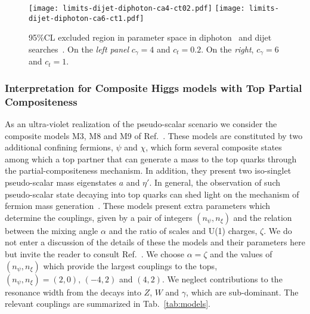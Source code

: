 \documentclass[aps,prd,amsmath,amssymb,superscriptaddress, preprintnumbers,preprint,nofootinbib,a4paper]{revtex4}
\begin{document}
\begin{figure}[H]
\texttt{[image: limits-dijet-diphoton-ca4-ct02.pdf]}  
\texttt{[image: limits-dijet-diphoton-ca6-ct1.pdf]}  
\caption{95\%CL excluded region in parameter space in diphoton~\cite{Aaboud:2017yyg} and dijet searches~\cite{Aaboud:2017yvp}. On the \emph{left panel} $c_\gamma=4$ and $c_t=0.2$. On the \emph{right}, $c_\gamma=6$ and $c_t=1$.   }
\label{fig:dijet-diphoton}
\end{figure}



\subsubsection*{Interpretation for Composite Higgs models with Top Partial Compositeness}

As an ultra-violet realization of the pseudo-scalar scenario we consider the composite models M3, M8 and M9 of Ref.~\cite{Belyaev:2016ftv}. These models are  constituted by two additional confining fermions, $\psi$ and $\chi$, which form several composite states among which a top partner that can generate a mass to the top quarks through the partial-compositeness mechanism. In addition, they present two iso-singlet pseudo-scalar mass eigenstates $a$ and $\eta'$.
In general, the observation of such pseudo-scalar state decaying into top quarks can shed light on the mechanism of fermion mass generation~\cite{Alanne:2016rpe}.
These models present extra parameters which determine the couplings, given by a pair of integers $(n_\psi,n_\xi)$ and the relation between the mixing angle $\alpha$ and the ratio of scales and U(1) charges, $\zeta$. 
We do not enter a discussion of the details of these the models and their parameters here but invite the reader to consult Ref.~\cite{Belyaev:2016ftv}.
We choose $\alpha=\zeta$ and the values of $(n_\psi,n_\xi)$ which provide the largest couplings to the tops, $(n_\psi,n_\xi)=(2,0),\,(-4,2)$ and $(4,2)$. 
We neglect contributions to the resonance width from the decays into $Z$, $W$ and $\gamma$, which are sub-dominant. 
The relevant couplings are summarized in Tab.~\ref{tab:models}.
\end{document}

